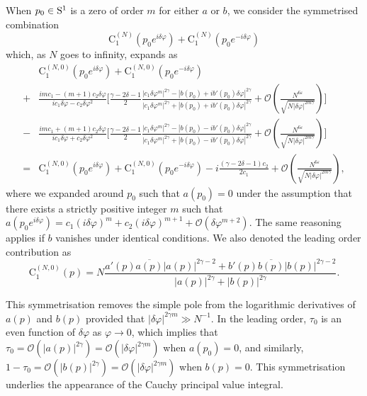 \documentclass[pdflatex,sn-mathphys-num]{sn-jnl}
\theoremstyle{thmstyleone}
\numberwithin{equation}{section}
\newcommand{\Cc}{\mathrm{C}}
\begin{document}
When $p_0\in{\rm S}^1$ is a zero of order $m$ for either $a$ or $b$, we consider the symmetrised combination 
\begin{equation}
    \Cc_1^{(N)}(p_0e^{i\delta \varphi})+\Cc_1^{(N)}(p_0e^{-i\delta \varphi})
\end{equation}
which, as $N$ goes to infinity, expands as
\begin{equation}\label{Symmetrisation}
\begin{split}
&\Cc_1^{(N,0)}(p_0e^{i\delta \varphi})+\Cc_1^{(N,0)}(p_0e^{-i\delta \varphi})\\
+&\frac{imc_1-(m+1)c_2\delta\varphi}{ic_1\delta\varphi-c_2\delta\varphi^{2}}\biggl[\frac{\gamma-2\delta-1}{2}\frac{|c_1\delta\varphi^m|^{2\gamma}-|b(p_0)+ib'(p_0)\delta\varphi|^{2\gamma}}{|c_1\delta\varphi^m|^{2\gamma}+|b(p_0)+ib'(p_0)\delta\varphi|^{2\gamma}}+\mathcal{O}\left(\frac{N^{6\varepsilon}}{\sqrt{N|\delta\varphi|^{2m\gamma}}}\right)\biggl]\\
-&\frac{imc_1+(m+1)c_2\delta\varphi}{ic_1\delta\varphi+c_2\delta\varphi^{2}}\biggl[\frac{\gamma-2\delta-1}{2}\frac{|c_1\delta\varphi^m|^{2\gamma}-|b(p_0)-ib'(p_0)\delta\varphi|^{2\gamma}}{|c_1\delta\varphi^m|^{2\gamma}+|b(p_0)-ib'(p_0)\delta\varphi|^{2\gamma}}+\mathcal{O}\left(\frac{N^{6\varepsilon}}{\sqrt{N|\delta\varphi|^{2m\gamma}}}\right)\biggl]\\
=&\Cc_1^{(N,0)}(p_0e^{i\delta \varphi})+\Cc_1^{(N,0)}(p_0e^{-i\delta \varphi})-i\frac{(\gamma-2\delta-1)c_2}{2c_1}+\mathcal{O}\left(\frac{N^{6\varepsilon}}{\sqrt{N|\delta\varphi|^{2m\gamma}}}\right),
\end{split}
\end{equation}
where we expanded around $p_{0}$ such that $a(p_{0})=0$ under the assumption that there exists a strictly positive integer $m$ such that $a(p_0e^{i\delta \varphi})=c_1(i\delta\varphi)^m+c_2(i\delta\varphi)^{m+1}+\mathcal{O}(\delta\varphi^{m+2})$. The same reasoning applies if $b$ vanishes under identical conditions. We also denoted the leading order contribution as
\begin{equation}
\Cc_1^{(N,0)}(p)=N\frac{a'(p)\overline{a(p)}|a(p)|^{2\gamma-2}+b'(p)\overline{b(p)}|b(p)|^{2\gamma-2}}{|a(p)|^{2\gamma}+|b(p)|^{2\gamma}}.
\end{equation}

This symmetrisation removes the simple pole from the logarithmic derivatives of $a(p)$ and $b(p)$ provided that $|\delta \varphi|^{2\gamma m}\gg N^{-1}$. In the leading order, $\tau_{0}$ is an even function of $\delta\varphi$ as $\varphi\to 0$, which implies that $\tau_0=\mathcal{O}(|a(p)|^{2\gamma})=\mathcal{O}(|\delta\varphi|^{2\gamma m})$ when $a(p_0)=0$, and similarly, $1-\tau_0=\mathcal{O}(|b(p)|^{2\gamma})=\mathcal{O}(|\delta\varphi|^{2\gamma m})$ when $b(p)=0$. This symmetrisation underlies the appearance of the Cauchy principal value integral.
\end{document}
